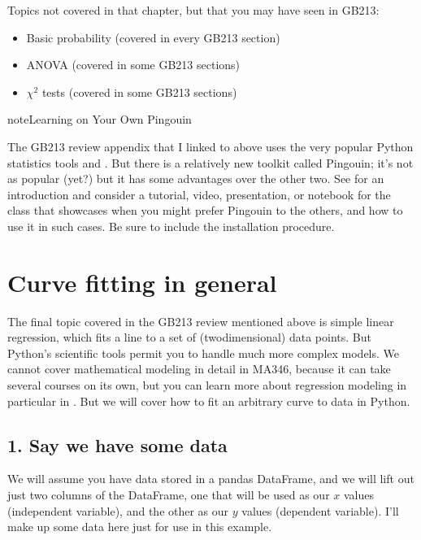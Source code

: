 \documentclass[letterpaper,10pt,english]{sphinxmanual}
\begin{document}
Topics not covered in that chapter, but that you may have seen in GB213:
\begin{itemize}
\item {} 
Basic probability (covered in every GB213 section)

\item {} 
ANOVA (covered in some GB213 sections)

\item {} 
\(\chi^2\) tests (covered in some GB213 sections)

\end{itemize}

\begin{sphinxadmonition}{note}{Learning on Your Own \sphinxhyphen{} Pingouin}

The GB213 review appendix that I linked to above uses the very popular Python statistics tools  and .  But there is a relatively new toolkit called Pingouin; it’s not as popular (yet?) but it has some advantages over the other two.  See  for an introduction and consider a tutorial, video, presentation, or notebook for the class that showcases when you might prefer Pingouin to the others, and how to use it in such cases.  Be sure to include the installation procedure.
\end{sphinxadmonition}


\section{Curve fitting in general}
\label{\detokenize{chapter-9-math-and-stats:curve-fitting-in-general}}
The final topic covered in the GB213 review mentioned above is simple linear regression, which fits a line to a set of (two\sphinxhyphen{}dimensional) data points.  But Python’s scientific tools permit you to handle much more complex models.  We cannot cover mathematical modeling in detail in MA346, because it can take several courses on its own, but you can learn more about regression modeling in particular in .  But we will cover how to fit an arbitrary curve to data in Python.


\subsection{1. Say we have some data}
\label{\detokenize{chapter-9-math-and-stats:say-we-have-some-data}}
We will assume you have data stored in a pandas DataFrame, and we will lift out just two columns of the DataFrame, one that will be used as our \(x\) values (independent variable), and the other as our \(y\) values (dependent variable).  I’ll make up some data here just for use in this example.
\end{document}
